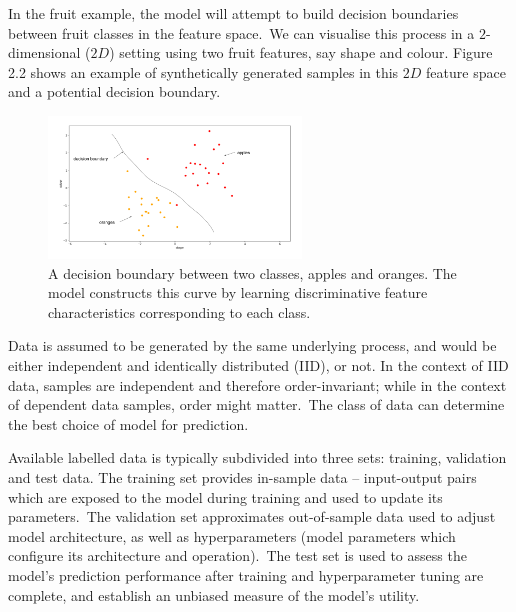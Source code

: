 \noindent In the fruit example, the model will attempt to build decision boundaries between fruit classes in the feature space.\ We can visualise this process in a $2$-dimensional ($ 2D $) setting using two fruit features, say shape and colour. Figure 2.2 shows an example of synthetically generated samples in this $ 2D $ feature space and a potential decision boundary.

\begin{figure}[H]
   	\centering
    	\includegraphics[width=0.6\textwidth, height=0.4\textwidth]{oranges_and_apples_decision_boundary}
	\caption{A decision boundary between two classes, apples and oranges. The model constructs this curve by learning discriminative feature characteristics corresponding to each class.}
\end{figure}

\noindent Data is assumed to be generated by the same underlying process, and would be either independent and identically distributed (IID), or not. In the context of IID data, samples are independent and therefore order-invariant; while in the context of dependent data samples, order might matter.\ The class of data can determine the best choice of model for prediction. \par

\noindent Available labelled data is typically subdivided into three sets: training, validation and test data. The training set provides in-sample data -- input-output pairs which are exposed to the model during training and used to update its parameters.\ The validation set approximates out-of-sample data used to adjust model architecture, as well as hyperparameters (model parameters which configure its architecture and operation).\ The test set is used to assess the model's prediction performance after training and hyperparameter tuning are complete, and establish an unbiased measure of the model's utility.  \par

